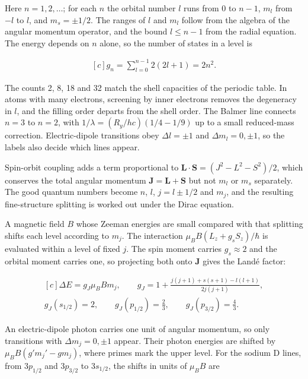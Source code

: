 \documentclass[11pt,oneside]{book}
\newenvironment{centeredalign}{\[\begin{gathered}[c]}{\end{gathered}\]}
\begin{document}
Here \(n=1,2,\ldots\); for each \(n\) the orbital number \(l\) runs from \(0\) to \(n-1\), \(m_l\) from \(-l\) to \(l\), and \(m_s=\pm1/2\). The ranges of \(l\) and \(m_l\) follow from the algebra of the angular momentum operator, and the bound \(l\leq n-1\) from the radial equation. The energy depends on \(n\) alone, so the number of states in a level is

\begin{centeredalign}
g_n=\sum_{l=0}^{n-1}2(2l+1)=2n^2.
\end{centeredalign}

The counts 2, 8, 18 and 32 match the shell capacities of the periodic table. In atoms with many electrons, screening by inner electrons removes the degeneracy in \(l\), and the filling order departs from the shell order. The Balmer line connects \(n=3\) to \(n=2\), with \(1/\lambda=(R_y/hc)(1/4-1/9)\) up to a small reduced-mass correction. Electric-dipole transitions obey \(\Delta l=\pm1\) and \(\Delta m_l=0,\pm1\), so the labels also decide which lines appear.

Spin-orbit coupling adds a term proportional to \(\mathbf L\cdot\mathbf S=(J^2-L^2-S^2)/2\), which conserves the total angular momentum \(\mathbf J=\mathbf L+\mathbf S\) but not \(m_l\) or \(m_s\) separately. The good quantum numbers become \(n\), \(l\), \(j=l\pm1/2\) and \(m_j\), and the resulting fine-structure splitting is worked out under the Dirac equation.

A magnetic field \(B\) whose Zeeman energies are small compared with that splitting shifts each level according to \(m_j\). The interaction \(\mu_BB(L_z+g_sS_z)/\hbar\) is evaluated within a level of fixed \(j\). The spin moment carries \(g_s\approx2\) and the orbital moment carries one, so projecting both onto \(\mathbf J\) gives the Landé factor:

\begin{centeredalign}
\Delta E=g_J\mu_BBm_j,\qquad g_J=1+\frac{j(j+1)+s(s+1)-l(l+1)}{2j(j+1)},\\
g_J(s_{1/2})=2,\qquad g_J(p_{1/2})=\tfrac23,\qquad g_J(p_{3/2})=\tfrac43.
\end{centeredalign}

An electric-dipole photon carries one unit of angular momentum, so only transitions with \(\Delta m_j=0,\pm1\) appear. Their photon energies are shifted by \(\mu_BB(g'm_j'-gm_j)\), where primes mark the upper level. For the sodium D lines, from \(3p_{1/2}\) and \(3p_{3/2}\) to \(3s_{1/2}\), the shifts in units of \(\mu_BB\) are
\end{document}
